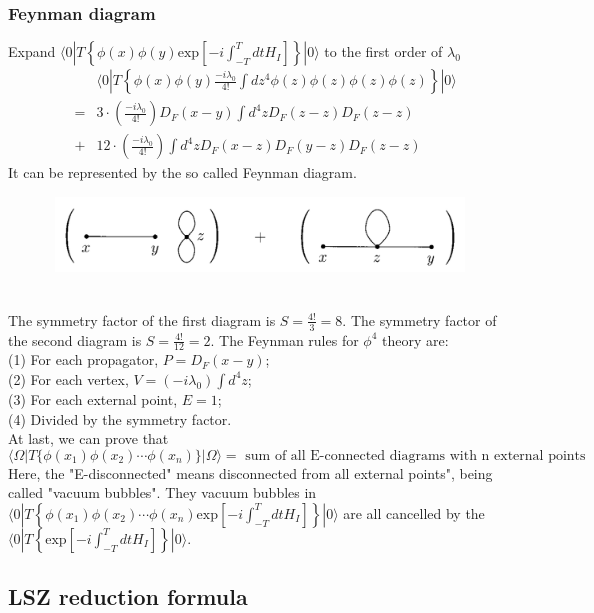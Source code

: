 \documentclass{article}
\begin{document}
\subsubsection{Feynman diagram}
Expand $\langle 0 | T \left\{ \phi(x) \phi(y) \mathrm{exp} \left[ -i \int_{-T}^{T} dt H_I \right]\right\} | 0 \rangle$ to the first order of $\lambda_0$
\begin{eqnarray}
& &\langle 0 | T \left\{ \phi(x) \phi(y) \frac{-i\lambda_0}{4!} \int dz^4 \phi(z) \phi(z) \phi(z) \phi(z) \right\} | 0 \rangle \nonumber \\
&=& 3 \cdot (\frac{-i\lambda_0}{4!}) D_F(x-y) \int d^4 z D_F(z-z) D_F(z-z) \nonumber \\
&+& 12 \cdot (\frac{-i\lambda_0}{4!}) \int d^4 z  D_F(x-z) D_F(y-z) D_F(z-z) \nonumber
\end{eqnarray}
It can be represented by the so called Feynman diagram.
\begin{figure}[!h]
\centering
\includegraphics[height=2cm ,width=14cm]{./pic/FD1.png}
\caption*{}
\end{figure}
\\
The symmetry factor of the first diagram is $S = \frac{4!}{3} = 8$.
The symmetry factor of the second diagram is $S = \frac{4!}{12} = 2$.
The Feynman rules for $\phi^4$ theory are:\\
(1) For each propagator, $P = D_F(x-y)$;\\
(2) For each vertex, $V = (-i\lambda_0)\int d^4z$;\\
(3) For each external point, $E=1$;\\
(4) Divided by the symmetry factor.\\
At last, we can prove that
\[\langle \Omega | T \{ \phi(x_1) \phi(x_2) \cdots \phi(x_n) \} | \Omega \rangle = \mbox{ sum of all E-connected diagrams with n external points}\]
Here, the "E-disconnected" means disconnected from all external points", being called "vacuum bubbles". They vacuum bubbles in $\langle 0 | T \left\{ \phi(x_1) \phi(x_2) \cdots \phi(x_n) \mathrm{exp} \left[ -i \int_{-T}^{T} dt H_I \right]\right\} | 0 \rangle$ are all cancelled by the $\langle 0 | T \left\{ \mathrm{exp} \left[ -i \int_{-T}^{T} dt H_I \right]\right\} | 0 \rangle$.

\subsection{LSZ reduction formula}
\end{document}
